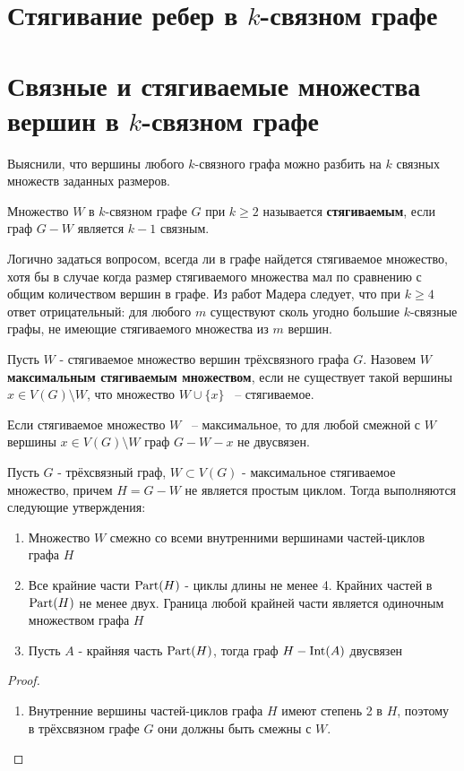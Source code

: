 
\section{Стягивание ребер в $k$-связном графе}

\section{Связные и стягиваемые множества вершин в $k$-связном графе}


Выяснили, что вершины любого $k$-связного графа можно разбить на  $k$ связных множеств заданных размеров.

\begin{df}
	Множество $W$ в $k$-связном графе $G$ при $k \geqslant 2$ называется \textbf{стягиваемым}, если граф $G - W$ является $k - 1$ связным.
\end{df}

Логично задаться вопросом, всегда ли в графе найдется стягиваемое множество, хотя бы в случае когда размер стягиваемого множества мал по сравнению с общим количеством вершин в графе.
Из работ Мадера следует, что при $k \geqslant 4$ ответ отрицательный: для любого  $m$ существуют сколь угодно большие $k$-связные графы, не имеющие стягиваемого множества из $m$ вершин. 

\begin{df}
	Пусть $W$ - стягиваемое множество вершин трёхсвязного графа $G$. Назовем $W$ \textbf{максимальным стягиваемым множеством}, если не существует такой вершины $x \in V(G) \setminus W$, что множество  $W \cup \{x\}$ ~-- стягиваемое.
\end{df}

\begin{remrk}
	Если стягиваемое множество $W$ ~-- максимальное, то для любой смежной с $W$ вершины $x \in V(G) \setminus W$ граф  $G - W - x$ не двусвязен.
\end{remrk}

\begin{lm}[Лемма 5.3] \label{lemma:5_3}
	Пусть $G$ - трёхсвязный граф, $W \subset V(G)$ - максимальное стягиваемое множество, причем $H = G - W$ не является простым циклом. Тогда выполняются следующие утверждения:

	\begin{enumerate}
		\item Множество $W$ смежно со всеми внутренними вершинами частей-циклов графа $H$
		\item Все крайние части  $\operatorname{Part}(H)$ - циклы длины не менее 4. Крайних частей в $\operatorname{Part}(H)$ не менее двух. Граница любой крайней части является одиночным множеством графа $H$
		\item Пусть $A$ - крайняя часть $\operatorname{Part}(H)$, тогда граф $H - \operatorname{Int}(A)$ двусвязен
	\end{enumerate}

\end{lm}

\begin{proof}
	\begin{enumerate}
		\item Внутренние вершины частей-циклов графа $H$ имеют степень 2 в $H$, поэтому в трёхсвязном графе $G$ они должны быть смежны с $W$.
	\end{enumerate}
\end{proof}
